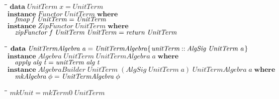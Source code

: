 \documentclass[10pt]{article}
\newlength{\lwidth}\setlength{\lwidth}{4.5cm}
\newlength{\cwidth}\setlength{\cwidth}{8mm} %
\newcommand{\Conid}[1]{\mathit{#1}}
\newcommand{\Varid}[1]{\mathit{#1}}
\begin{document}
\begin{tabbing}
\qquad\=\hspace{\lwidth}\=\hspace{\cwidth}\=\+\kill
${\mathbf{data}\;\Conid{UnitTerm}\;\Varid{x}\mathrel{=}\Conid{UnitTerm}}$\\
${}$\\
${\mathbf{instance}\;\Conid{Functor}\;\Conid{UnitTerm}\;\mathbf{where}}$\\
${\hskip1.00em\relax\Varid{fmap}\;\Varid{f}\;\Conid{UnitTerm}\mathrel{=}\Conid{UnitTerm}}$\\
${}$\\
${}$\\
${}$\\
${\mathbf{instance}\;\Conid{ZipFunctor}\;\Conid{UnitTerm}\;\mathbf{where}}$\\
${\hskip1.00em\relax\Varid{zipFunctor}\;\Varid{f}\;\Conid{UnitTerm}\;\Conid{UnitTerm}\mathrel{=}\Varid{return}\;\Conid{UnitTerm}}$
\end{tabbing}

\begin{tabbing}
\qquad\=\hspace{\lwidth}\=\hspace{\cwidth}\=\+\kill
${\mathbf{data}\;\Conid{UnitTermAlgebra}\;\Varid{a}\mathrel{=}\Conid{UnitTermAlgebra}\{\mskip1.5mu \Varid{unitTerm}\mathbin{::}\Conid{AlgSig}\;\Conid{UnitTerm}\;\Varid{a}\mskip1.5mu\}}$\\
${}$\\
${\mathbf{instance}\;\Conid{Algebra}\;\Conid{UnitTerm}\;\Conid{UnitTermAlgebra}\;\Varid{a}\;\mathbf{where}}$\\
${\hskip1.00em\relax\Varid{apply}\;\Varid{alg}\;\Varid{t}\mathrel{=}\Varid{unitTerm}\;\Varid{alg}\;\Varid{t}}$\\
${}$\\
${}$\\
${}$\\
${\mathbf{instance}\;\Conid{AlgebraBuilder}\;\Conid{UnitTerm}\;(\Conid{AlgSig}\;\Conid{UnitTerm}\;\Varid{a})\;\Conid{UnitTermAlgebra}\;\Varid{a}\;\mathbf{where}}$\\
${\hskip1.00em\relax\Varid{mkAlgebra}\;\Varid{\phi}\mathrel{=}\Conid{UnitTermAlgebra}\;\Varid{\phi}}$
\end{tabbing}

\begin{tabbing}
\qquad\=\hspace{\lwidth}\=\hspace{\cwidth}\=\+\kill
${\Varid{mkUnit}\mathrel{=}\Varid{mkTerm0}\;\Conid{UnitTerm}}$
\end{tabbing}
\end{document}
